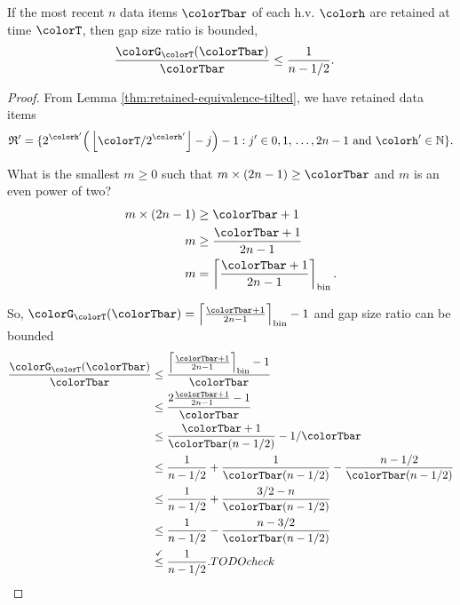 \begin{lemma}
\label{thm:gap-size-ratio-tilted}
If the most recent $n$ data items $\colorTbar$ of each h.v. $\colorh$ are retained at time $\colorT$, then gap size ratio is bounded,
\begin{align*}
\frac{\colorG_{\colorT}(\colorTbar)}{\colorTbar}
&\leq
\frac{1}{n - 1/2}.
\end{align*}
\end{lemma}
\begin{proof}

From Lemma \ref{thm:retained-equivalence-tilted}, we have retained data items
\begin{align*}
\mathfrak{R}' =
\{
2^{\colorh'}\Big(\left\lfloor \colorT / 2^{\colorh'} \right\rfloor - j\Big) - 1
  :
  j' \in 0,1,\,\ldots,2n-1
  \text{ and }
  \colorh' \in \mathbb{N}
\}.
\end{align*}


What is the smallest $m \geq 0$ such that $m \times (2n - 1) \geq \colorTbar$ and $m$ is an even power of two?
\begin{align*}
m \times (2n - 1)
&\geq \colorTbar + 1\\
m
&\geq \frac{\colorTbar + 1}{2n - 1}\\
m
&= \left\lceil \frac{\colorTbar + 1 }{2n - 1} \right\rceil_{\mathrm{bin}}.
\end{align*}

So, $\colorG_{\colorT}(\colorTbar) = \left\lceil \frac{\colorTbar + 1 }{2n - 1} \right\rceil_{\mathrm{bin}} - 1$ and gap size ratio can be bounded
\begin{align*}
\frac{\colorG_{\colorT}(\colorTbar)}{\colorTbar}
&\leq
\frac{
\left\lceil \frac{\colorTbar + 1 }{2n - 1} \right\rceil_{\mathrm{bin}} - 1
}{
\colorTbar
}\\
&\leq
\frac{
2\frac{\colorTbar + 1}{2n - 1} - 1
}{
\colorTbar
}\\
&\leq
\frac{\colorTbar + 1}{\colorTbar(n - 1/2)} - 1/\colorTbar\\
&\leq
\frac{1}{n - 1/2} + \frac{1}{\colorTbar(n - 1/2)} - \frac{n - 1/2}{\colorTbar(n - 1/2)}\\
&\leq
\frac{1}{n - 1/2} + \frac{3/2 - n}{\colorTbar(n - 1/2)}\\
&\leq
\frac{1}{n - 1/2} - \frac{n - 3/2}{\colorTbar(n - 1/2)}\\
&\stackrel{\checkmark}{\leq}
\frac{1}{n - 1/2}. TODO check
\end{align*}

\end{proof}
